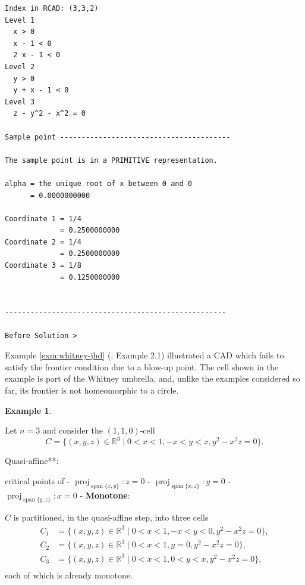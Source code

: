 \documentclass[
]{book}
\theoremstyle{definition}
\theoremstyle{definition}
\newtheorem{example}{Example}[chapter]
\theoremstyle{definition}
\theoremstyle{definition}
\theoremstyle{remark}
\begin{document}
\begin{verbatim}
Index in RCAD: (3,3,2)
Level 1
  x > 0
  x - 1 < 0
  2 x - 1 < 0
Level 2
  y > 0
  y + x - 1 < 0
Level 3
  z - y^2 - x^2 = 0

Sample point ----------------------------------------

The sample point is in a PRIMITIVE representation.

alpha = the unique root of x between 0 and 0
      = 0.0000000000

Coordinate 1 = 1/4
             = 0.2500000000
Coordinate 2 = 1/4
             = 0.2500000000
Coordinate 3 = 1/8
             = 0.1250000000


----------------------------------------------------

Before Solution >
\end{verbatim}

Example \ref{exm:whitney-jhd} (\citet{jhd20}, Example 2.1) illustrated a CAD which fails to satisfy the frontier condition due to a blow-up point.
The cell shown in the example is part of the Whitney umbrella, and, unlike the examples considered so far, its frontier is not homeomorphic to a circle.

\begin{example}
\protect\hypertarget{exm:fr-3-whitney-jhd}{}\label{exm:fr-3-whitney-jhd}\citep[Example 2.1]{jhd20}

Let \(n = 3\) and consider the \((1,1,0)\)-cell
\[
C = \{ (x,y,z) \in \mathbb{R}^3 \mid 0 < x < 1, -x < y < x, y^2 - x^2 z = 0 \}.
\]
\end{example}

Quasi-affine**:

critical points of
- \({\operatorname{proj}_{{\operatorname{span} \{x,y\}}}}: z = 0\)
- \({\operatorname{proj}_{{\operatorname{span} \{x,z\}}}}: y = 0\)
- \({\operatorname{proj}_{{\operatorname{span} \{y,z\}}}}: x = 0\)
- \textbf{Monotone}:

\(C\) is partitioned, in the quasi-affine step, into three cells
\begin{align}
  C_1 &= \{ (x,y,z) \in \mathbb{R}^3 \mid 0 < x < 1, -x < y < 0, y^2 - x^2 z = 0 \},\\
  C_2 &= \{ (x,y,z) \in \mathbb{R}^3 \mid 0 < x < 1, y = 0, y^2 - x^2 z = 0 \},\\
  C_3 &= \{ (x,y,z) \in \mathbb{R}^3 \mid 0 < x < 1, 0 < y < x, y^2 - x^2 z = 0 \},\\
  \end{align}
each of which is already monotone.
\end{document}
